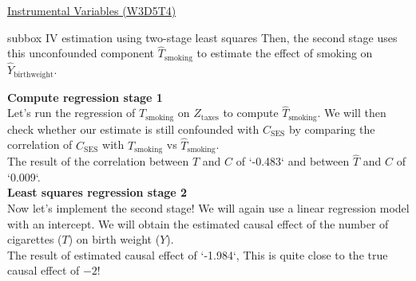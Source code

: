 \begin{textbox}{\href{https://compneuro.neuromatch.io/tutorials/W3D5_NetworkCausality/student/W3D5_Tutorial4.html}{Instrumental Variables (W3D5T4)}   }
\begin{subbox}{subbox}{ IV estimation using two-stage least squares
}
Then, the second stage uses this unconfounded component $\hat{T}_{\text{smoking}}$ to estimate the effect of smoking on $\hat{Y}_{\text{birthweight}}$. 

\textbf{Compute regression stage 1}\\

Let's run the regression of $T_{\text{smoking}}$ on $Z_\text{taxes}$ to compute $\hat{T}_{\text{smoking}}$. We will then check whether our estimate is still confounded with $C_{\text{SES}}$ by comparing the correlation of $C_{\text{SES}}$  with $T_{\text{smoking}}$ vs $\hat{T}_{\text{smoking}}$.\\
The result of the correlation between $T$ and $C$ of `-0.483` and between $\hat{T}$ and $C$ of `0.009`.\\

\textbf{Least squares regression stage 2}\\
Now let's implement the second stage! We will again use a linear regression model with an intercept. We will obtain the estimated causal effect of the number of cigarettes ($T$) on birth weight ($Y$).\\

The result of estimated causal effect of `-1.984`, This is quite close to the true causal effect of $-2$!

\end{subbox}
\end{textbox}
